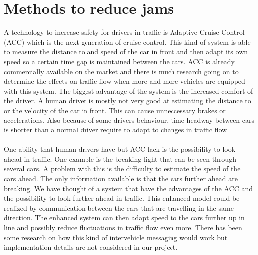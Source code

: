 \section{Methods to reduce jams}
A technology to increase safety for drivers in traffic is Adaptive Cruise
Control (ACC) which is the next generation of cruise control. This kind of
system is able to measure the distance to and speed of the car in front and then
adapt its own speed so a certain time gap is maintained between the cars. ACC
is already commercially available on the market and there is much research
going on to determine the effects on traffic flow when more and more vehicles are
equipped with this system. The biggest advantage of the system
is the increased comfort of the driver. A human
driver is mostly not very good at estimating the distance to or the velocity of the car
in front. This can cause unneccessary brakes or accelerations. Also because of
some drivers behaviour, time headway between cars is shorter than a normal
driver require to adapt to changes in traffic flow \cite{acc}\\\\

One ability that human drivers have but ACC lack is the possibility to look
ahead in traffic. One example is the breaking light that can be seen through
several cars. 
 A problem with this is the difficulty to estimate the speed of the
cars ahead. The only information available is that the cars further ahead are
breaking. We have thought of a system that have the advantages of the ACC and
the possibility to look further ahead in traffic. This enhanced model could
be realized by communication between the cars that are travelling in the same
direction. The enhanced system can then adapt speed to the cars further up in line and possibly reduce fluctuations in traffic flow even more. There has been some research on how this kind of intervehicle messaging would work  \cite{communication} but implementation details are not considered in our project.
